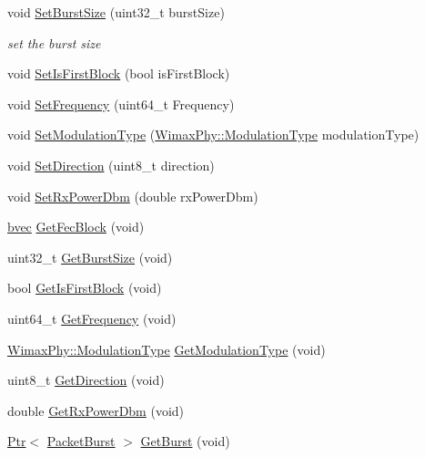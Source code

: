 \begin{DoxyCompactItemize}
void \hyperlink{classns3_1_1simpleOfdmSendParam_ad8bc0a9c4553ea59139d8db5777ab466}{Set\+Burst\+Size} (uint32\+\_\+t burst\+Size)
\begin{DoxyCompactList}\small\item\em set the burst size \end{DoxyCompactList}\item 
void \hyperlink{classns3_1_1simpleOfdmSendParam_ad77e7fe9dedfa7e438e4eeee58ae6e2f}{Set\+Is\+First\+Block} (bool is\+First\+Block)
\item 
void \hyperlink{classns3_1_1simpleOfdmSendParam_a9f13980b95cb6c72cac1e9d6fe536a31}{Set\+Frequency} (uint64\+\_\+t Frequency)
\item 
void \hyperlink{classns3_1_1simpleOfdmSendParam_a0bededd3f1533c75e5543a8d5f902b64}{Set\+Modulation\+Type} (\hyperlink{classns3_1_1WimaxPhy_a044c5d8a48ca992c39c2a946f6e755fa}{Wimax\+Phy\+::\+Modulation\+Type} modulation\+Type)
\item 
void \hyperlink{classns3_1_1simpleOfdmSendParam_ab9f7c72acb0e5b48071c7360bcbda11f}{Set\+Direction} (uint8\+\_\+t direction)
\item 
void \hyperlink{classns3_1_1simpleOfdmSendParam_a22d165b9d6cc0ddbee36a4e6d7928501}{Set\+Rx\+Power\+Dbm} (double rx\+Power\+Dbm)
\item 
\hyperlink{namespacens3_a184f2682613716e1a24969b3e70b4242}{bvec} \hyperlink{classns3_1_1simpleOfdmSendParam_a0edc15e2da20503a1e756106ea493988}{Get\+Fec\+Block} (void)
\item 
uint32\+\_\+t \hyperlink{classns3_1_1simpleOfdmSendParam_a03d351699c40a951640b8e230acf7d63}{Get\+Burst\+Size} (void)
\item 
bool \hyperlink{classns3_1_1simpleOfdmSendParam_ab5f66cfd049ef926634647a36f3f4fec}{Get\+Is\+First\+Block} (void)
\item 
uint64\+\_\+t \hyperlink{classns3_1_1simpleOfdmSendParam_aa6477a525ea6ac91c9e7e1cb1b1a1536}{Get\+Frequency} (void)
\item 
\hyperlink{classns3_1_1WimaxPhy_a044c5d8a48ca992c39c2a946f6e755fa}{Wimax\+Phy\+::\+Modulation\+Type} \hyperlink{classns3_1_1simpleOfdmSendParam_a796a2adb46042abb6b618f6223cc1c4d}{Get\+Modulation\+Type} (void)
\item 
uint8\+\_\+t \hyperlink{classns3_1_1simpleOfdmSendParam_a425723a84bbff5f09b1a43e3d2a8029f}{Get\+Direction} (void)
\item 
double \hyperlink{classns3_1_1simpleOfdmSendParam_a97618b26e6682a89e419711ff9d1747d}{Get\+Rx\+Power\+Dbm} (void)
\item 
\hyperlink{classns3_1_1Ptr}{Ptr}$<$ \hyperlink{classns3_1_1PacketBurst}{Packet\+Burst} $>$ \hyperlink{classns3_1_1simpleOfdmSendParam_ae7acf5974cfa33f1b8d06190c860f5b3}{Get\+Burst} (void)
\end{DoxyCompactItemize}
